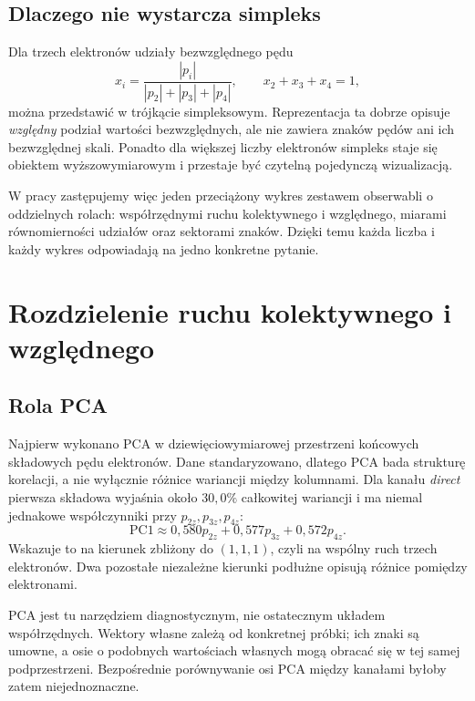 \documentclass[12pt,letterpaper,oneside]{report}
\numberwithin{equation}{chapter}
\numberwithin{figure}{chapter}
\numberwithin{table}{chapter}
\begin{document}
\section{Dlaczego nie wystarcza simpleks}

Dla trzech elektronów udziały bezwzględnego pędu
\begin{equation}
x_i=\frac{|p_i|}{|p_2|+|p_3|+|p_4|},\qquad x_2+x_3+x_4=1,
\label{eq:shares-main1}
\end{equation}
można przedstawić w trójkącie simpleksowym. Reprezentacja ta dobrze
opisuje \emph{względny} podział wartości bezwzględnych, ale nie zawiera
znaków pędów ani ich bezwzględnej skali. Ponadto dla większej liczby
elektronów simpleks staje się obiektem wyższowymiarowym i przestaje być
czytelną pojedynczą wizualizacją.

W pracy zastępujemy więc jeden przeciążony wykres zestawem obserwabli o
oddzielnych rolach: współrzędnymi ruchu kolektywnego i względnego,
miarami równomierności udziałów oraz sektorami znaków. Dzięki temu każda
liczba i każdy wykres odpowiadają na jedno konkretne pytanie.

\chapter{Rozdzielenie ruchu kolektywnego i względnego}

\section{Rola PCA}

Najpierw wykonano PCA w dziewięciowymiarowej przestrzeni końcowych
składowych pędu elektronów. Dane standaryzowano, dlatego PCA bada
strukturę korelacji, a nie wyłącznie różnice wariancji między kolumnami.
Dla kanału \textit{direct} pierwsza składowa wyjaśnia około \(30{,}0\%\)
całkowitej wariancji i ma niemal jednakowe współczynniki przy
\(p_{2z},p_{3z},p_{4z}\):
\[
\mathrm{PC1}\approx
0{,}580p_{2z}+0{,}577p_{3z}+0{,}572p_{4z}.
\]
Wskazuje to na kierunek zbliżony do \((1,1,1)\), czyli na wspólny ruch
trzech elektronów. Dwa pozostałe niezależne kierunki podłużne opisują
różnice pomiędzy elektronami.

PCA jest tu narzędziem diagnostycznym, nie ostatecznym układem
współrzędnych. Wektory własne zależą od konkretnej próbki; ich znaki są
umowne, a osie o podobnych wartościach własnych mogą obracać się w tej
samej podprzestrzeni. Bezpośrednie porównywanie osi PCA między kanałami
byłoby zatem niejednoznaczne.
\end{document}
